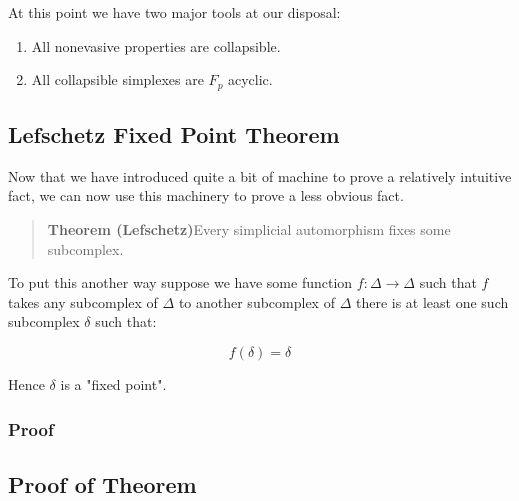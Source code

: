 \documentclass[letterpaper,12pt]{article}
\begin{document}
At this point we have two major tools at our disposal:

\begin{enumerate}
    \item{
            All nonevasive properties are collapsible.
        }
    \item{
            All collapsible simplexes are $F_p$ acyclic.
        }
\end{enumerate}


\subsection{Lefschetz Fixed Point Theorem}

Now that we have introduced quite a bit of machine to prove a relatively intuitive fact, we can now use this machinery to prove a less obvious fact.

\begin{quote}
    \textbf{Theorem (Lefschetz)}Every simplicial automorphism fixes some subcomplex.
\end{quote}

To put this another way suppose we have some function $f : \Delta \to \Delta$ such that $f$ takes any subcomplex of $\Delta$ to another subcomplex of $\Delta$ there is at least one such subcomplex $\delta$ such that:

$$f(\delta) = \delta$$

Hence $\delta$ is a "fixed point".

\subsubsection{Proof}


\subsection{Proof of Theorem}
\end{document}
